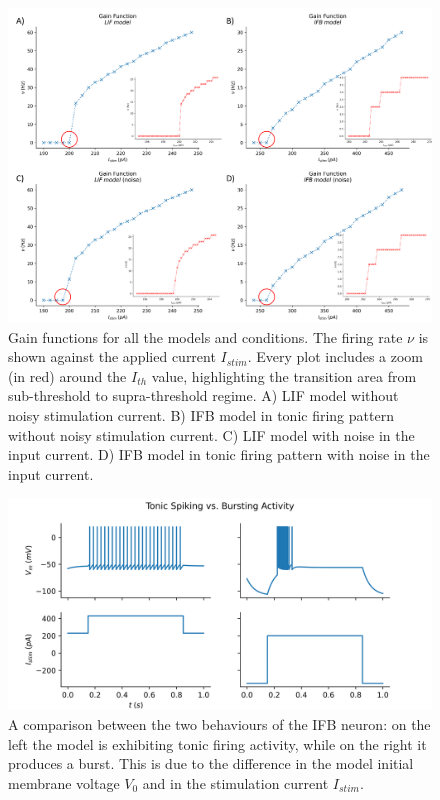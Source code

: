 \documentclass[10.5pt]{article}
\begin{document}
\begin{figure}
    \includegraphics[scale=0.065]{gain}
    \centering
    \caption{Gain functions for all the models and
    conditions. The firing rate \(\nu\) is shown
    against the applied current \(I_{stim}\). Every plot
    includes a zoom (in red) around the \(I_{th}\) value,
    highlighting the transition area from
    sub-threshold to supra-threshold regime.
    A) LIF model without noisy stimulation current.
    B) IFB model in tonic firing pattern without noisy stimulation current. C) LIF model with
    noise in the input current. D) IFB model in tonic firing pattern with noise in the input current.}
    \label{fig:gain}
\end{figure}

\begin{figure}
    \includegraphics[scale=0.7]{IFB_tonic_bursting}
    \centering
    \caption{A comparison between the two behaviours
    of the IFB neuron: on the left the model is
    exhibiting tonic firing activity, while on the
    right it produces a burst. This is due to
    the difference in the model initial membrane voltage \(V_{0}\)
    and in the stimulation current \(I_{stim}\).}
    \label{fig:burst}
\end{figure}

\nocite{*}



\end{document}
